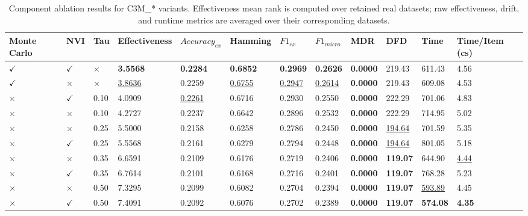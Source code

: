 \begin{table}
\caption{Component ablation results for C3M\_* variants. Effectiveness mean rank is computed over retained real datasets; raw effectiveness, drift, and runtime metrics are averaged over their corresponding datasets.}
\label{tab:component_ablation_results}
\begin{tabular}{llllllllllll}
\toprule
Monte Carlo & NVI & Tau & Effectiveness & $Accuracy_{ex}$ & Hamming & $F1_{ex}$ & $F1_{micro}$ & MDR & DFD & Time & Time/Item (cs) \\
\midrule
$\checkmark$ & $\checkmark$ & $\times$ & \textbf{3.5568} & \textbf{0.2284} & \textbf{0.6852} & \textbf{0.2969} & \textbf{0.2626} & \textbf{0.0000} & 219.43 & 611.43 & 4.56 \\
$\checkmark$ & $\times$ & $\times$ & \underline{3.8636} & 0.2259 & \underline{0.6755} & \underline{0.2947} & \underline{0.2614} & \textbf{0.0000} & 219.43 & 609.08 & 4.53 \\
$\times$ & $\checkmark$ & 0.10 & 4.0909 & \underline{0.2261} & 0.6716 & 0.2930 & 0.2550 & \textbf{0.0000} & 222.29 & 701.06 & 4.83 \\
$\times$ & $\times$ & 0.10 & 4.2727 & 0.2237 & 0.6642 & 0.2896 & 0.2532 & \textbf{0.0000} & 222.29 & 714.95 & 5.02 \\
$\times$ & $\times$ & 0.25 & 5.5000 & 0.2158 & 0.6258 & 0.2786 & 0.2450 & \textbf{0.0000} & \underline{194.64} & 701.59 & 5.35 \\
$\times$ & $\checkmark$ & 0.25 & 5.5568 & 0.2161 & 0.6279 & 0.2794 & 0.2448 & \textbf{0.0000} & \underline{194.64} & 801.05 & 5.18 \\
$\times$ & $\times$ & 0.35 & 6.6591 & 0.2109 & 0.6176 & 0.2719 & 0.2406 & \textbf{0.0000} & \textbf{119.07} & 644.90 & \underline{4.44} \\
$\times$ & $\checkmark$ & 0.35 & 6.7614 & 0.2101 & 0.6168 & 0.2716 & 0.2401 & \textbf{0.0000} & \textbf{119.07} & 768.28 & 5.23 \\
$\times$ & $\times$ & 0.50 & 7.3295 & 0.2099 & 0.6082 & 0.2704 & 0.2394 & \textbf{0.0000} & \textbf{119.07} & \underline{593.89} & 4.45 \\
$\times$ & $\checkmark$ & 0.50 & 7.4091 & 0.2092 & 0.6076 & 0.2702 & 0.2389 & \textbf{0.0000} & \textbf{119.07} & \textbf{574.08} & \textbf{4.35} \\
\bottomrule
\end{tabular}
\end{table}
